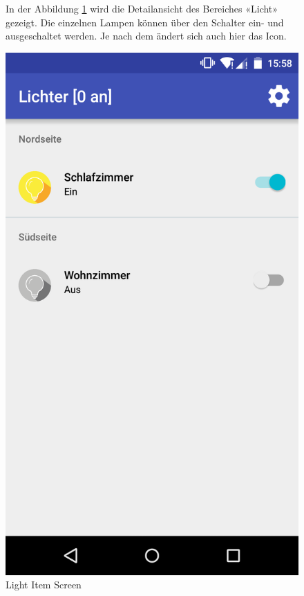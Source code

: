 \begin{figure}[htbp]
	\begin{minipage}{0.6\textwidth} 
In der Abbildung \ref{fig:screenshot_4} wird die Detailansicht des Bereiches «Licht» gezeigt. Die einzelnen Lampen können über den Schalter ein- und ausgeschaltet werden. Je nach dem ändert sich auch hier das Icon.
	\end{minipage}
	\hfill
	\begin{minipage}{0.32\textwidth}
		\includegraphics[scale=0.12]{appendix/img/AppScreenshots/Screenshot4}
		\caption{Light Item Screen}
		\label{fig:screenshot_4}
	\end{minipage}
\end{figure}

